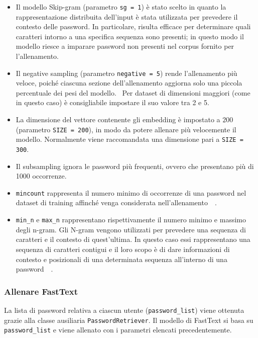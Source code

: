 \begin{itemize}
    \item Il modello Skip-gram (parametro \texttt{sg = 1}) è stato scelto in quanto la rappresentazione distribuita dell'input è stata utilizzata per prevedere il contesto delle password. In particolare, risulta efficace per determinare quali caratteri intorno a una specifica sequenza sono presenti; in questo modo il modello riesce a imparare password non presenti nel corpus fornito per l'allenamento.~\cite{fasttext}
    \item Il negative sampling (parametro \texttt{negative = 5}) rende l'allenamento più veloce, poiché ciascuna sezione dell'allenamento aggiorna solo una piccola percentuale dei pesi del modello.~\cite{negative} Per dataset di dimensioni maggiori (come in questo caso) è consigliabile impostare il suo valore tra 2 e 5.~\cite{gensim}
    \item La dimensione del vettore contenente gli embedding è impostato a $200$ (parametro \texttt{SIZE = 200}), in modo da potere allenare più velocemente il modello. Normalmente viene raccomandata una dimensione pari a \texttt{SIZE = 300}.~\cite{gensim}
    \item Il subsampling ignora le password più frequenti, ovvero che presentano più di 1000 occorrenze.
    \item \texttt{mincount} rappresenta il numero minimo di occorrenze di una password nel dataset di training affinché venga considerata nell'allenamento~\cite{biijeta}~\cite{gensim}.
    \item \texttt{min\_n} e \texttt{max\_n} rappresentano rispettivamente il numero minimo e massimo degli n-gram. Gli N-gram vengono utilizzati per prevedere una sequenza di caratteri e il contesto di quest'ultima. In questo caso essi rappresentano una sequenza di caratteri contigui e il loro scopo è di dare informazioni di contesto e posizionali di una determinata sequenza all'interno di una password~\cite{biijeta}~\cite{gensim}.
\end{itemize}

\subsubsection{Allenare FastText}
La lista di password relativa a ciascun utente (\texttt{password\_list}) viene ottenuta grazie alla classe ausiliaria \texttt{PasswordRetriever}. Il modello di FastText si basa su \texttt{password\_list} e viene allenato con i parametri elencati precedentemente.

